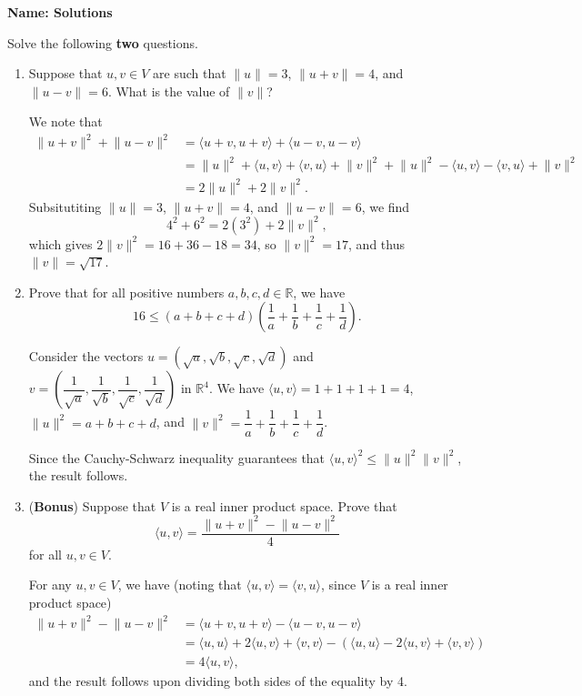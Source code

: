 \documentclass[12pt]{article}
\newcommand{\points}[1]{\marginpar{\hspace{24pt}[#1]}}
\newcommand{\R}{\mathbb{R}}
\newcommand{\len}[1]{\lVert #1\rVert}
\begin{document}
\thispagestyle{fancy}
{\bf Name: Solutions}

\bigskip

Solve the following {\bf two} questions. 
 \begin{enumerate}
 \item Suppose that $u,v\in V$ are such that $\len{u}=3$, $\len{u+v}=4$, and $\len{u-v}=6$. What is the value of $\len{v}$? \points{5}

\bigskip

We note that
\begin{align*}
 \len{u+v}^2+\len{u-v}^2 & = \langle u+v,u+v\rangle + \langle u-v,u-v\rangle\\
& = \len{u}^2+\langle u,v\rangle+\langle v,u\rangle+\len{v}^2+\len{u}^2-\langle u,v\rangle-\langle v,u\rangle +\len{v}^2\\
& = 2\len{u}^2+2\len{v}^2.
\end{align*}
Subsitutiting $\len{u}=3$, $\len{u+v}=4$, and $\len{u-v}=6$, we find
\[
 4^2+6^2 = 2(3^2)+2\len{v}^2,
\]
which gives $2\len{v}^2 = 16+36-18 = 34$, so $\len{v}^2=17$, and thus $\len{v}=\sqrt{17}$.

\bigskip

 \item Prove that for all positive numbers $a,b,c,d\in\R$, we have \points{5}
\[
 16\leq (a+b+c+d)\left(\frac{1}{a}+\frac{1}{b}+\frac{1}{c}+\frac{1}{d}\right).
\]

\bigskip

Consider the vectors $u=(\sqrt{a},\sqrt{b},\sqrt{c},\sqrt{d})$ and $v = \left(\dfrac{1}{\sqrt{a}},\dfrac{1}{\sqrt{b}},\dfrac{1}{\sqrt{c}},\dfrac{1}{\sqrt{d}}\right)$ in $\R^4$. We have $\langle u,v\rangle = 1+1+1+1=4$, $\len{u}^2=a+b+c+d$, and $\len{v}^2 = \dfrac{1}{a}+\dfrac{1}{b}+\dfrac{1}{c}+\dfrac{1}{d}$.

Since the Cauchy-Schwarz inequality guarantees that $\langle u,v\rangle^2\leq \len{u}^2\len{v}^2$, the result follows.

\bigskip

\item ({\bf Bonus}) Suppose that $V$ is a real inner product space. Prove that \points{5}
\[
 \langle u,v\rangle = \frac{\len{u+v}^2-\len{u-v}^2}{4}
\]
for all $u,v\in V$.

\bigskip

For any $u,v\in V$, we have (noting that $\langle u,v\rangle = \langle v,u\rangle$, since $V$ is a real inner product space)
\begin{align*}
 \len{u+v}^2-\len{u-v}^2 & = \langle u+v,u+v\rangle - \langle u-v,u-v\rangle\\
& = \langle u,u\rangle+ 2\langle u,v\rangle + \langle v,v\rangle -(\langle u,u\rangle - 2\langle u,v\rangle +\langle v,v\rangle)\\
& = 4\langle u,v\rangle,
\end{align*}
and the result follows upon dividing both sides of the equality by 4.
 \end{enumerate}
\end{document}

